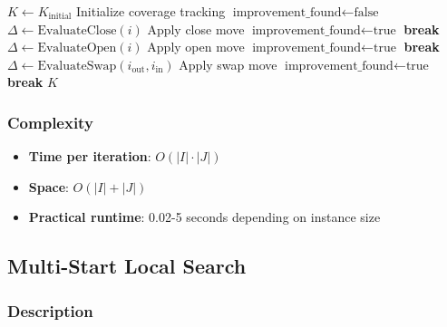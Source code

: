 \documentclass[11pt,a4paper]{article}
\begin{document}
\begin{algorithm}[H]
\caption{Local Search for MCLP}
\begin{algorithmic}[1]
\State $K \gets K_{\text{initial}}$ 
\State Initialize coverage tracking
\Repeat
  \State $\text{improvement\_found} \gets \text{false}$
   
    \State $\Delta \gets \text{EvaluateClose}(i)$
      \State Apply close move
      \State $\text{improvement\_found} \gets \text{true}$
      \State \textbf{break}
    \EndIf
  \EndFor
     
      \State $\Delta \gets \text{EvaluateOpen}(i)$
        \State Apply open move
        \State $\text{improvement\_found} \gets \text{true}$
        \State \textbf{break}
      \EndIf
    \EndFor
  \EndIf
     
      \State $\Delta \gets \text{EvaluateSwap}(i_{\text{out}}, i_{\text{in}})$
        \State Apply swap move
        \State $\text{improvement\_found} \gets \text{true}$
        \State \textbf{break}
      \EndIf
    \EndFor
  \EndIf
{}
\State \Return $K$
\end{algorithmic}
\end{algorithm}

\subsubsection{Complexity}
\begin{itemize}
  \item \textbf{Time per iteration}: $O(|I| \cdot |J|)$
  \item \textbf{Space}: $O(|I| + |J|)$
  \item \textbf{Practical runtime}: 0.02-5 seconds depending on instance size
\end{itemize}

\subsection{Multi-Start Local Search}

\subsubsection{Description}
\end{document}
